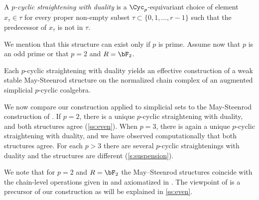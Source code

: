 \begin{definition}
	A \emph{$p$-cyclic straightening with duality} is a $\Cyc_p$-equivariant choice of element $x_\tau\in \tau$ for every proper non-empty subset $\tau \subset \{0,1,\dots,r-1\}$ such that the predecessor of $x_\tau$ is not in $\tau$.
\end{definition}
We mention that this structure can exist only if $p$ is prime. Assume now that $p$ is an odd prime or that $p=2$ and $R=\bF_2$.

\begin{theorem}\label{thm:main}
	Each $p$-cyclic straightening with duality yields an effective construction of a weak stable May-Steenrod structure on the normalized chain complex of an augmented simplicial $p$-cyclic coalgebra.
\end{theorem}


We now compare our construction applied to simplicial sets to the May-Steenrod construction of \cite{medina2021may_st}. If $p=2$, there is a unique $p$-cyclic straightening with duality, and both structures agree (\cref{ss:even}). When $p=3$, there is again a unique $p$-cyclic straightening with duality, and we have observed computationally that both structures agree. For each $p>3$ there are several $p$-cyclic straightenings with duality and the structures are different (\cref{s:suspension}). 

We note that for $p=2$ and $R=\bF_2$ the May--Steenrod structures coincide with the chain-level operations given in \cite{medina2021fast_sq} and axiomatized in \cite{medina2022axiomatic}. The viewpoint of \cite{medina2021fast_sq} is a precursor of our construction as will be explained in \cref{ss:even}. 







